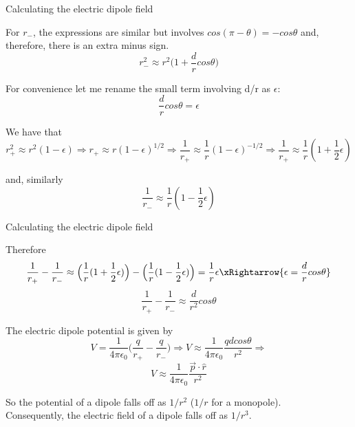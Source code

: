%
%
%

\begin{frame}{Calculating the electric dipole field}

For $r_{-}$, the expressions are similar but involves $cos(\pi - \theta) = -cos\theta$ and,
therefore, there is an extra minus sign.
\begin{equation*}
   r_{-}^{2} \approx r^{2} \Big( 1 + \frac{d}{r} cos\theta \Big)
\end{equation*}

For convenience let me rename the small term involving d/r as $\epsilon$:
\begin{equation*}
  \frac{d}{r} cos\theta = \epsilon
\end{equation*}

We have that
\begin{equation*}
   r_{+}^{2} \approx r^{2} (1 - \epsilon) \Rightarrow
   r_{+} \approx r (1 - \epsilon)^{1/2} \Rightarrow
   \frac{1}{r_{+}} \approx \frac{1}{r} (1 - \epsilon)^{-1/2} \Rightarrow
   \frac{1}{r_{+}} \approx \frac{1}{r} (1 + \frac{1}{2}\epsilon)
\end{equation*}

and, similarly
\begin{equation*}
   \frac{1}{r_{-}} \approx \frac{1}{r} (1 - \frac{1}{2}\epsilon)
\end{equation*}

\end{frame}

%
%
%

\begin{frame}{Calculating the electric dipole field}

Therefore
\begin{equation*}
  \frac{1}{r_{+}} - \frac{1}{r_{-}} \approx
    \Big( \frac{1}{r} (1 + \frac{1}{2}\epsilon) \Big) -
    \Big( \frac{1}{r} (1 - \frac{1}{2}\epsilon) \Big) =
    \frac{1}{r} \epsilon \xRightarrow{\epsilon = \frac{d}{r} cos\theta}
\end{equation*}
\begin{equation*}
  \frac{1}{r_{+}} - \frac{1}{r_{-}} \approx \frac{d}{r^2} cos\theta
\end{equation*}

The electric dipole potential is given by
\begin{equation*}
  V = \frac{1}{4\pi\epsilon_0} \Big( \frac{q}{r_{+}} - \frac{q}{r_{-}} \Big) \Rightarrow
  V \approx \frac{1}{4\pi\epsilon_0} \frac{q d cos\theta}{r^2} \Rightarrow
\end{equation*}
\begin{equation*}
  V \approx \frac{1}{4\pi\epsilon_0} \frac{\vec{p} \cdot \hat{r}}{r^2}
\end{equation*}

So the potential of a dipole falls off as $1/r^2$ ($1/r$ for a monopole).\\
Consequently, the electric field of a dipole falls off as $1/r^3$.\\

\end{frame}

